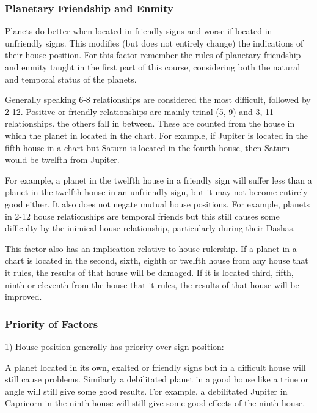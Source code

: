 \subsubsection{Planetary Friendship and Enmity}
 

Planets do better when located in friendly signs and worse if located in unfriendly signs. This modifies (but does not entirely change) the indications of their house position. For this factor remember the rules of planetary friendship and enmity taught in the first part of this course, considering both the natural and temporal status of the planets.

 

Generally speaking 6-8 relationships are considered the most difficult, followed by 2-12. Positive or friendly relationships are mainly trinal (5, 9) and 3, 11 relationships. the others fall in between. These are counted from the house in which the planet in located in the chart. For example, if Jupiter is located in the fifth house in a chart but Saturn is located in the fourth house, then Saturn would be twelfth from Jupiter.

 

For example, a planet in the twelfth house in a friendly sign will suffer less than a planet in the twelfth house in an unfriendly sign, but it may not become entirely good either. It also does not negate mutual house positions. For example, planets in 2-12 house relationships are temporal friends but this still causes some difficulty by the inimical house relationship, particularly during their Dashas.

 

This factor also has an implication relative to house rulership. If a planet in a chart is located in the second, sixth, eighth or twelfth house from any house that it rules, the results of that house will be damaged. If it is located third, fifth, ninth or eleventh from the house that it rules, the results of that house will be improved.

 

\subsubsection{Priority of Factors}
 

1) House position generally has priority over sign position:

A planet located in its own, exalted or friendly signs but in a difficult house will still cause problems. Similarly a debilitated planet in a good house like a trine or angle will still give some good results. For example, a debilitated Jupiter in Capricorn in the ninth house will still give some good effects of the ninth house.

